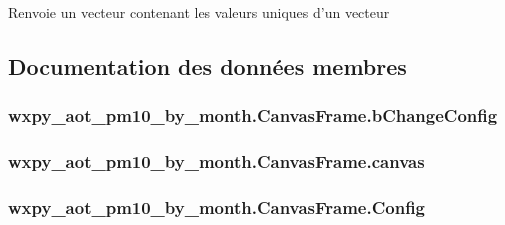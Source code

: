 \begin{DoxyVerb}Renvoie un vecteur contenant les valeurs uniques d'un vecteur  \end{DoxyVerb}
 

\subsection{Documentation des données membres}
\hypertarget{classwxpy__aot__pm10__by__month_1_1_canvas_frame_a7eda9972e375d18a4c8d2ee6d7677a2a}{
\subsubsection[{b\-Change\-Config}]{\setlength{\rightskip}{0pt plus 5cm}wxpy\-\_\-aot\-\_\-pm10\-\_\-by\-\_\-month.\-Canvas\-Frame.\-b\-Change\-Config}}\label{classwxpy__aot__pm10__by__month_1_1_canvas_frame_a7eda9972e375d18a4c8d2ee6d7677a2a}
\hypertarget{classwxpy__aot__pm10__by__month_1_1_canvas_frame_a2ec1012eb520bb1917248baec0526212}{
\subsubsection[{canvas}]{\setlength{\rightskip}{0pt plus 5cm}wxpy\-\_\-aot\-\_\-pm10\-\_\-by\-\_\-month.\-Canvas\-Frame.\-canvas}}\label{classwxpy__aot__pm10__by__month_1_1_canvas_frame_a2ec1012eb520bb1917248baec0526212}
\hypertarget{classwxpy__aot__pm10__by__month_1_1_canvas_frame_a131cdd35c70d8ea6e2ee9b587400d2ba}{
\subsubsection[{Config}]{\setlength{\rightskip}{0pt plus 5cm}wxpy\-\_\-aot\-\_\-pm10\-\_\-by\-\_\-month.\-Canvas\-Frame.\-Config}}\label{classwxpy__aot__pm10__by__month_1_1_canvas_frame_a131cdd35c70d8ea6e2ee9b587400d2ba}
